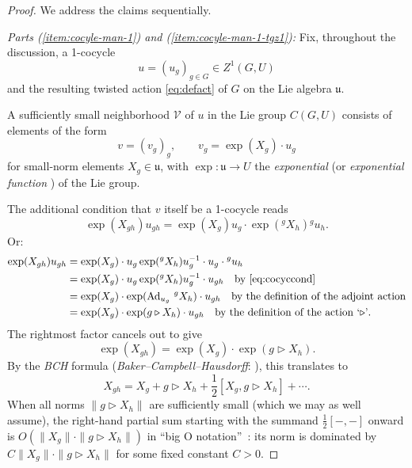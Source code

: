 \documentclass[10pt,a4paper]{amsart}
\numberwithin{equation}{section}
\newcommand\cV{{\mathcal V}}
\newcommand\fu{{\mathfrak u}}
\begin{document}
\begin{proof}
 We address the claims sequentially.

 \emph{Parts {\rm (\ref{item:cocyle-man-1})} and {\rm(\ref{item:cocyle-man-1-tgz1})}:} Fix, throughout the discussion, a 1-cocycle
 \begin{equation*}
 u=(u_g)_{g\in G}\in Z^1(G,U)
 \end{equation*}
 and the resulting twisted action \eqref{eq:defact} of $G$ on the Lie algebra $\fu$.

 A sufficiently small neighborhood $\cV$ of $u$ in the Lie group $C(G,U)$ consists of elements of the form
 \begin{equation*}
 v=(v_g)_g,\qquad v_g = \exp(X_g)\cdot u_g
 \end{equation*}
 for small-norm elements $X_g\in \fu$, with $\exp\colon\fu\to U$ the {\it exponential} (or {\it exponential function} \cite[discussion following Definition IV.1]{neeb-inf} ) of the Lie group.


 The additional condition that $v$ itself be a 1-cocycle reads
 \begin{equation*}
 \exp(X_{gh})u_{gh} = \exp(X_g)u_g \cdot \exp\left({}^gX_h\right){}^gu_h.
 \end{equation*}
 Or:
 \begin{align*}
 \exp(X_{gh})u_{gh} &= \exp(X_g)\cdot u_g\exp({}^gX_h)u_g^{-1}\cdot u_g\cdot{}^gu_h\\
 &= \exp(X_g)\cdot u_g\exp({}^gX_h)u_g^{-1}\cdot u_{gh}
 \quad\text{by \eqref{eq:cocyccond}}\\
 &=\exp(X_g)\cdot \exp(\operatorname{Ad}_{u_g}\,{}^gX_h)\cdot u_{gh}
 \quad\text{by the definition of the adjoint action}\\
 &=\exp(X_g)\cdot \exp(g\triangleright X_h)\cdot u_{gh}
 \quad\text{by the definition of the action `$\triangleright$'}.
 \end{align*}
 The rightmost factor cancels out to give
 \begin{equation*}
 \exp(X_{gh}) = \exp(X_g)\cdot \exp(g\triangleright X_h).
 \end{equation*}
 By the {\it BCH} formula ({\it Baker--Campbell--Hausdorff}: \cite[Definition IV.1.3 and Corollary IV.1.10]{neeb-lc}), this translates to
 \begin{equation*}
 X_{gh} = X_g + g\triangleright X_h + \frac 12\left[X_g,g\triangleright X_h\right] + \cdots.
 \end{equation*}
 When all norms $\|g\triangleright X_h\|$ are sufficiently small (which we may as well assume), the right-hand partial sum starting with the summand $\frac 12[-,-]$ onward is $O(\|X_g\|\cdot \|g\triangleright X_h\|)$ in ``big O notation''~\cite{bigo}: its norm is dominated by $C\|X_g\|\cdot \|g\triangleright X_h\|$ for some fixed constant $C>0$.


\end{proof}
\end{document}
